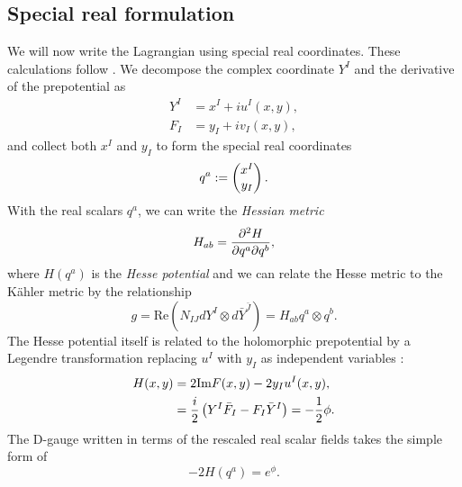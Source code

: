 \subsection{Special real formulation}
We will now write the Lagrangian  using special real coordinates. These calculations follow \cite{Mohaupt:2011aa}. We decompose the complex coordinate $Y^I$ and the derivative of the prepotential as
\begin{equation}
\begin{aligned}
 Y^I &= x^I + iu^I(x,y), \\
 F_I &= y_I + iv_I(x,y),
\end{aligned}
\end{equation}
and collect both $x^I$ and $y_I$ to form the special real coordinates
\begin{equation}
q^a := \begin{pmatrix} x^I \\ y_I \end{pmatrix}.
\end{equation}
With the real scalars $q^a$, we can write the \emph{Hessian metric}
\begin{equation*}
	H_{ab} = \frac{\partial ^2 H}{\partial q^a \partial q^b},
\end{equation*}
where $H(q^a)$ is the \emph{Hesse potential} and we can relate the Hesse metric to the K\"ahler metric by the relationship
\begin{equation*}
	g = \text{Re} \left(N_{IJ} dY^I \otimes d\bar{Y}^{\bar{J}} \right) = H_{ab} q^a \otimes q^b.
\end{equation*}
The Hesse potential itself is related to the holomorphic prepotential by a Legendre transformation replacing $u^I$ with $y_I$ as independent variables \cite{VicenteCortes2002}:
\begin{equation*}
\begin{aligned}
\label{eq:hessepotential}
	H(x,y) &= 2 \text{Im} F(x,y) - 2 y_I u^I(x,y), \\
	&= \frac{i}{2} \left(Y^I \bar{F}_I - F_I \bar{Y}^I \right) = - \frac{1}{2} \phi.
\end{aligned}
\end{equation*}
The D-gauge written in terms of the rescaled real scalar fields takes the simple form of
\begin{equation*}
	-2H(q^a) = e^\phi.
\end{equation*}

